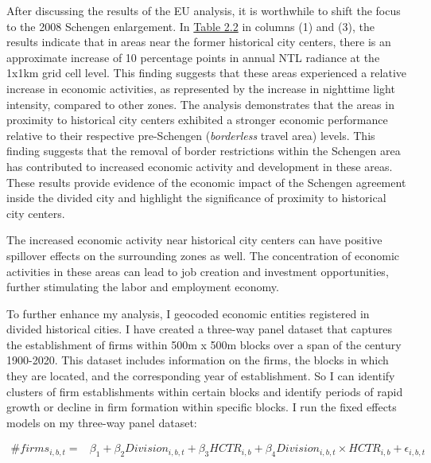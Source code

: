 \documentclass[12pt]{article}    %
\begin{document}
\par After discussing the results of the EU analysis, it is worthwhile to shift the focus to the 2008 Schengen enlargement. In \hyperlink{Table 2.2}{Table 2.2} in columns (1) and (3), the results indicate that in areas near the former historical city centers, there is an approximate increase of 10 percentage points in annual NTL radiance at the 1x1km grid cell level. This finding suggests that these areas experienced a relative increase in economic activities, as represented by the increase in nighttime light intensity, compared to other zones. The analysis demonstrates that the areas in proximity to historical city centers exhibited a stronger economic performance relative to their respective pre-Schengen (\textit{borderless} travel area) levels. This finding suggests that the removal of border restrictions within the Schengen area has contributed to increased economic activity and development in these areas. These results provide evidence of the economic impact of the Schengen agreement inside the divided city and highlight the significance of proximity to historical city centers.

\par The increased economic activity near historical city centers can have positive spillover effects on the surrounding zones as well. The concentration of economic activities in these areas can lead to job creation and investment opportunities, further stimulating the labor and employment economy.




\par To further enhance my analysis, I geocoded economic entities registered in divided historical cities. I have created a three-way panel dataset that captures the establishment of firms within 500m x 500m blocks over a span of the century 1900-2020. This dataset includes information on the firms, the blocks in which they are located, and the corresponding year of establishment. So I can identify clusters of firm establishments within certain blocks and identify periods of rapid growth or decline in firm formation within specific blocks. I run the fixed effects models on my three-way panel dataset:



\begin{equation} 
\renewcommand\theequation{2.2}
\begin{split} 
\# firms_{i,b,t}=&\beta_1+\beta _2 Division_{i,b,t}+ \beta_{3} HCTR_{i,b} +\beta_4 Division_{i,b,t}\times HCTR_{i,b}+\epsilon_{i,b,t}
 \end{split}
\end{equation}
\end{document}
